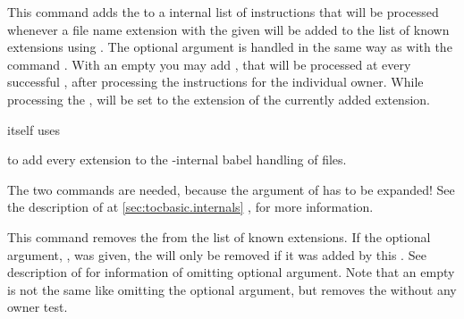 \begin{Declaration}
\end{Declaration}
%
This command
adds the  to a internal list of instructions that will be
processed whenever a file name extension with the given  will be
added to the list of known extensions using .  The
optional argument is handled in the same way as with the command
. With an empty  you may
add , that will be processed at every successful
, after processing the instructions for the individual
owner.  While processing the ,
 will be set to
the extension of the currently added extension.
\begin{Example}
   itself uses
\begin{lstcode}
  \AtAddToTocList[]{%
    \expandafter\tocbasic@extend@babel
    \expandafter{\@currext}%
  }
\end{lstcode}
  to add every extension to the -internal babel handling of
  files.
\end{Example}

The two  commands are needed, because the argument of
 has to be expanded!  See the description of
 at \autoref{sec:tocbasic.internals}%
, 
for more information.
%

\begin{Declaration}
\end{Declaration}
%
This command
removes the  from the list of known extensions.  If the
optional argument, , was given, the  will
only be removed if it was added by this . See description of
 for information of omitting optional argument. Note that
an empty  is not the same like omitting the optional argument,
but removes the  without any owner test.%
%

